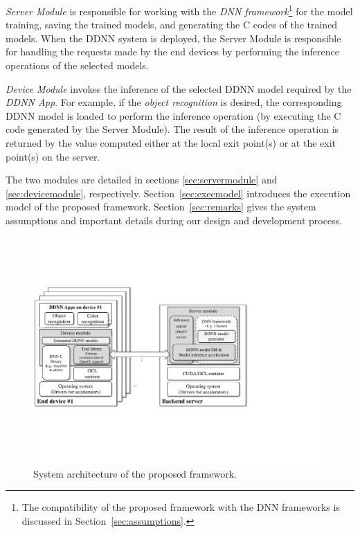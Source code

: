 \documentclass[conference]{IEEEtran}
\def\sectionname{Section}
\begin{document}
\emph{Server Module} is responsible for working with the \emph{DNN framework}\footnote{The compatibility of the proposed framework with the DNN frameworks is discussed in \sectionname~\ref{sec:assumptions}.} for the model training, saving the trained models, and generating the C codes of the trained models. When the DDNN system is deployed, the Server Module is responsible for handling the requests made by the end devices by performing the inference operations of the selected models.


\emph{Device Module} invokes the inference of the selected DDNN model required by the \emph{DDNN App}. For example, if the \emph{object recognition} is desired, the corresponding DDNN model is loaded to perform the inference operation (by executing the C code generated by the Server Module). The result of the inference operation is returned by the value computed either at the local exit point(s) or at the exit point(s) on the server.

The two modules are detailed in sections \ref{sec:servermodule} and \ref{sec:devicemodule}, respectively. \sectionname~\ref{sec:execmodel} introduces the execution model of the proposed framework. \sectionname~\ref{sec:remarks} gives the system assumptions and important details during our design and development process.


	
    \begin{figure}[tbh]
        \centering
        \includegraphics[width=\columnwidth]{figure/DDNNCF}
        \caption{System architecture of the proposed framework.}
        \label{fig:systemarchitecture} %
    \end{figure}
\end{document}
